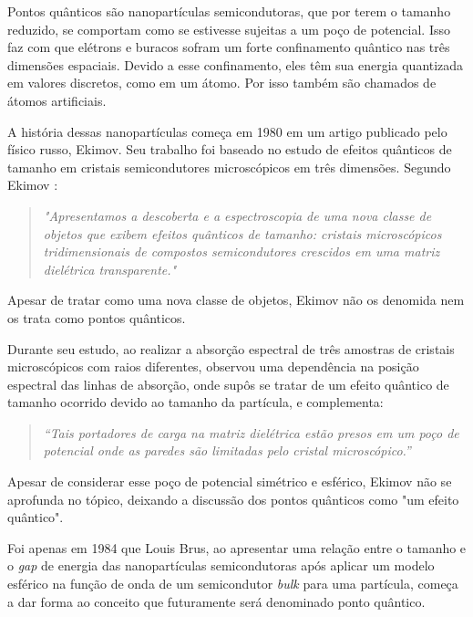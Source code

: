 \par Pontos quânticos\cite{introducao1} são nanopartículas semicondutoras, que por terem o tamanho reduzido, se comportam como se estivesse sujeitas a um poço de potencial. Isso faz com que elétrons e buracos sofram um forte confinamento quântico nas três dimensões espaciais. Devido a esse confinamento, eles têm sua energia quantizada em valores discretos, como em um átomo. Por isso também são chamados de átomos artificiais.

\par A história dessas nanopartículas começa em 1980 em um artigo publicado pelo físico russo, Ekimov. Seu trabalho foi baseado no estudo de efeitos quânticos de tamanho em cristais semicondutores microscópicos em três dimensões. Segundo Ekimov \cite{introducao2}:

\begin{quote}
\textit{"Apresentamos a descoberta e a espectroscopia de uma nova classe de objetos que exibem efeitos quânticos de tamanho: cristais microscópicos tridimensionais de compostos semicondutores crescidos em uma matriz dielétrica transparente."}
\end{quote}

\par Apesar de tratar como uma nova classe de objetos, Ekimov não os denomida nem os trata como pontos quânticos.

\par Durante seu estudo, ao realizar a absorção espectral de três amostras de cristais microscópicos com raios diferentes, observou uma dependência na posição espectral das linhas de absorção, onde supôs se tratar de um efeito quântico de tamanho ocorrido devido ao tamanho da partícula, e complementa:

\begin{quote}
\textit{“Tais portadores de carga na matriz dielétrica estão presos em um poço de potencial onde as paredes são limitadas pelo cristal microscópico.”}
\end{quote}

\par Apesar de considerar esse poço de potencial simétrico e esférico, Ekimov não se aprofunda no tópico, deixando a discussão dos pontos quânticos como "um efeito quântico".

\par Foi apenas em 1984 que Louis Brus, ao apresentar uma relação entre o tamanho e o \textit{gap} de energia das nanopartículas semicondutoras após aplicar um modelo esférico na função de onda de um semicondutor \textit{bulk} para uma partícula, começa a dar forma ao conceito que futuramente será denominado ponto quântico.

